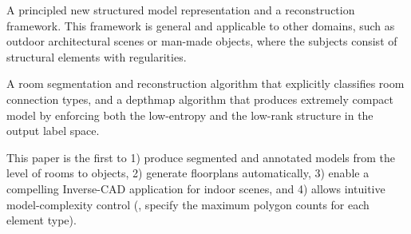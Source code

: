  A principled new structured
model representation and a reconstruction framework. This framework is
general and applicable to other domains, such as outdoor architectural
scenes or man-made objects,
where the subjects consist of structural elements with regularities.


 A room segmentation and
reconstruction algorithm that explicitly classifies room connection
types, and a depthmap algorithm that produces extremely compact model by
enforcing both the low-entropy and the low-rank structure in the output
label space.

 This paper is the first to 1)
produce segmented and annotated models from the level of rooms to
objects, 2) generate floorplans automatically, 3) enable a compelling
Inverse-CAD application for indoor scenes, and 4) allows intuitive
model-complexity control (\eg, specify the maximum polygon counts for
each element type).










